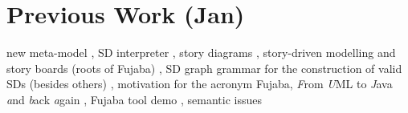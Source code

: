 \section{Previous Work (Jan)}

new meta-model \cite{HRvD+11},
SD interpreter \cite{GHS09},
story diagrams \cite{FNTZ00,Zun01},
story-driven modelling and story boards (roots of Fujaba) \cite{ZSW99,FNT98,DGZ04},
SD graph grammar for the construction of valid SDs (besides others) \cite{Kle99},
motivation for the acronym Fujaba, \textit{F}rom \textit{U}ML to \textit{J}ava \textit{a}nd \textit{b}ack \textit{a}gain \cite{JZ97},
Fujaba tool demo \cite{NNZ00},
semantic issues \cite{TMG06}
